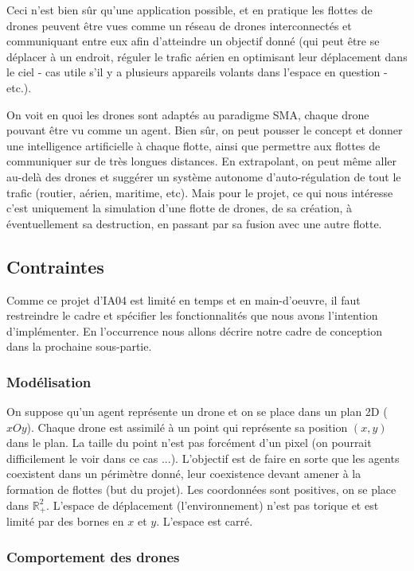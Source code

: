 \documentclass[11pt]{report}
\begin{document}
Ceci n'est bien sûr qu'une application possible, et en pratique les flottes de drones peuvent être vues comme un réseau de drones interconnectés et communiquant entre eux afin d'atteindre un objectif donné (qui peut être se déplacer à un endroit, réguler le trafic aérien en optimisant leur déplacement dans le ciel - cas utile s'il y a plusieurs appareils volants dans l'espace en question - etc.).

On voit en quoi les drones sont adaptés au paradigme SMA, chaque drone pouvant être vu comme un agent. Bien sûr, on peut pousser le concept et donner une intelligence artificielle à chaque flotte, ainsi que permettre aux flottes de communiquer sur de très longues distances. En extrapolant, on peut même aller au-delà des drones et suggérer un système autonome d'auto-régulation de tout le trafic (routier, aérien, maritime, etc). Mais pour le projet, ce qui nous intéresse c'est uniquement la simulation d'une flotte de drones, de sa création, à éventuellement sa destruction, en passant par sa fusion avec une autre flotte.

\subsection{Contraintes}

Comme ce projet d'IA04 est limité en temps et en main-d'oeuvre, il faut restreindre le cadre et spécifier les fonctionnalités que nous avons l'intention d'implémenter. En l'occurrence nous allons décrire notre cadre de conception dans la prochaine sous-partie.

\subsubsection{Modélisation} 

On suppose qu'un agent représente un drone et on se place dans un plan 2D ($xOy$). Chaque drone est assimilé à un point qui représente sa position $(x, y)$ dans le plan. La taille du point n'est pas forcément d'un pixel (on pourrait difficilement le voir dans ce cas ...). L'objectif est de faire en sorte que les agents coexistent dans un périmètre donné, leur coexistence devant amener à la formation de flottes (but du projet). Les coordonnées sont positives, on se place dans $\mathbb{R}^{2}_{+}$. L'espace de déplacement (l'environnement) n'est pas torique et est limité par des bornes en $x$ et $y$. L'espace est carré.

\subsubsection{Comportement des drones}
\end{document}
